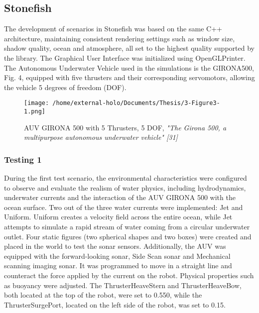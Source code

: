 \documentclass[]{article}
\begin{document}
	\subsection{Stonefish}
	
	The development of scenarios in Stonefish was based on the same C++ architecture, maintaining consistent rendering settings such as window size, shadow quality, ocean and atmosphere, all set to the highest quality supported by the library. The Graphical User Interface was initialized using OpenGLPrinter. The Autonomous Underwater Vehicle used in the simulations is the GIRONA500, Fig. 4, equipped with five thrusters and their corresponding servomotors, allowing the vehicle 5 degrees of freedom (DOF).
	
	\begin{figure}[h]
		\begin{center}
			\texttt{[image: /home/external-holo/Documents/Thesis/3-Figure3-1.png]}
			\caption{AUV GIRONA 500 with 5 Thrusters, 5 DOF, 
			\textit{"The Girona 500, a multipurpose autonomous underwater vehicle" [31]}}
		\end{center}
	\end{figure}

	\subsubsection{Testing 1}
	
	During the first test scenario, the environmental characteristics were configured to observe and evaluate the realism of water physics, including hydrodynamics, underwater currents and the interaction of the AUV GIRONA 500 with the ocean surface. Two out of the three water currents were implemented: Jet and Uniform. Uniform creates a velocity field across the entire ocean, while Jet attempts to simulate a rapid stream of water coming from a circular underwater outlet. Four static figures (two spherical shapes and two boxes) were created and placed in the world to test the sonar sensors. Additionally, the AUV was equipped with the forward-looking sonar, Side Scan sonar and Mechanical scanning imaging sonar. It was programmed to move in a straight line and counteract the force applied by the current on the robot. Physical properties such as buoyancy were adjusted. The ThrusterHeaveStern and ThrusterHeaveBow, both located at the top of the robot, were set to 0.550, while the ThrusterSurgePort, located on the left side of the robot, was set to 0.15.
	
\end{document}
